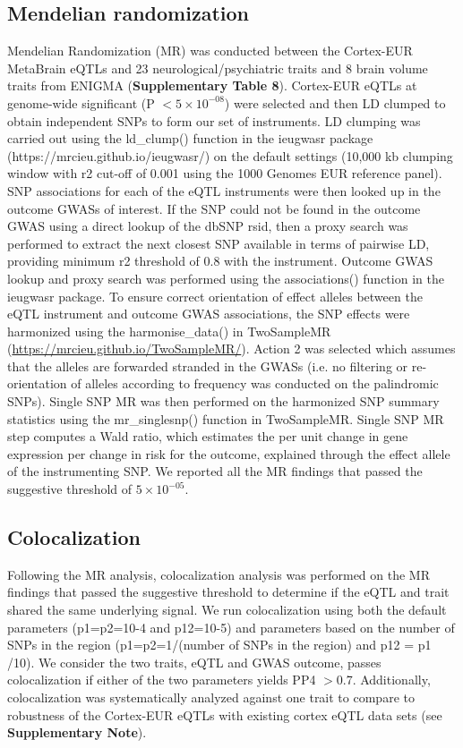 \subsection{Mendelian randomization}
Mendelian Randomization (MR) was conducted between the Cortex-EUR MetaBrain eQTLs and 23 neurological/psychiatric traits and 8 brain volume traits from ENIGMA (\textbf{Supplementary Table 8}). Cortex-EUR eQTLs at genome-wide significant (P $< 5 \times 10^{-08}$) were selected and then LD clumped to obtain independent SNPs to form our set of instruments. LD clumping was carried out using the ld\_clump() function in the ieugwasr package (https://mrcieu.github.io/ieugwasr/) on the default settings (10,000 kb clumping window with r2 cut-off of 0.001 using the 1000 Genomes EUR reference panel). SNP associations for each of the eQTL instruments were then looked up in the outcome GWASs of interest. If the SNP could not be found in the outcome GWAS using a direct lookup of the dbSNP rsid, then a proxy search was performed to extract the next closest SNP available in terms of pairwise LD, providing minimum r2 threshold of 0.8 with the instrument. Outcome GWAS lookup and proxy search was performed using the associations() function in the ieugwasr package. To ensure correct orientation of effect alleles between the eQTL instrument and outcome GWAS associations, the SNP effects were harmonized using the harmonise\_data() in TwoSampleMR (\url{https://mrcieu.github.io/TwoSampleMR/}). Action 2 was selected which assumes that the alleles are forwarded stranded in the GWASs (i.e. no filtering or re-orientation of alleles according to frequency was conducted on the palindromic SNPs). Single SNP MR was then performed on the harmonized SNP summary statistics using the mr\_singlesnp() function in TwoSampleMR. Single SNP MR step computes a Wald ratio, which estimates the per unit change in gene expression per change in risk for the outcome, explained through the effect allele of the instrumenting SNP. We reported all the MR findings that passed the suggestive threshold of $5 \times 10^{-05}$. 

\subsection{Colocalization}
Following the MR analysis, colocalization analysis was performed on the MR findings that passed the suggestive threshold to determine if the eQTL and trait shared the same underlying signal. We run colocalization using both the default parameters (p1=p2=10-4 and p12=10-5) and parameters based on the number of SNPs in the region (p1=p2=1/(number of SNPs in the region) and p12 = p1 /10). We consider the two traits, eQTL and GWAS outcome, passes colocalization if either of the two parameters yields PP4 $>$0.7. Additionally, colocalization was systematically analyzed against one trait to compare to robustness of the Cortex-EUR eQTLs with existing cortex eQTL data sets (see \textbf{Supplementary Note}). 


